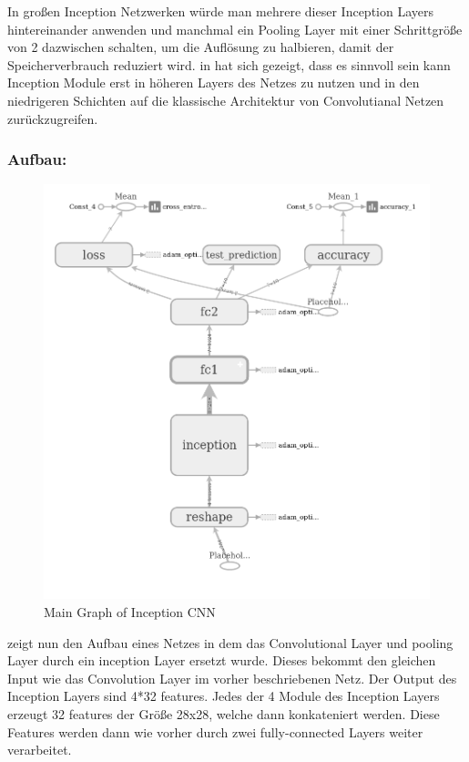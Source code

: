 \documentclass[runningheads,a4paper]{llncs}[2015/06/24]
\begin{document}
In großen Inception Netzwerken würde man mehrere dieser Inception Layers hintereinander anwenden und manchmal ein Pooling Layer mit einer Schrittgröße von 2 dazwischen schalten, um die Auflösung zu halbieren, damit der Speicherverbrauch reduziert wird. in \cite{inception_paper} hat sich gezeigt, dass es sinnvoll sein kann Inception Module erst in höheren Layers des Netzes zu nutzen und in den niedrigeren Schichten auf die klassische Architektur von Convolutianal Netzen zurückzugreifen.

\subsubsection*{Aufbau:}
\begin{figure}
	\includegraphics[width=\textwidth]{images/main_graph_inception.png}
	\caption{Main Graph of Inception CNN}
	\label{fig:main_graph_inception}
\end{figure}
 zeigt nun den Aufbau eines Netzes in dem das Convolutional Layer und pooling Layer durch ein inception Layer ersetzt wurde. Dieses bekommt den gleichen Input wie das Convolution Layer im vorher beschriebenen Netz. Der Output des Inception Layers sind 4*32 features. Jedes der 4 Module des Inception Layers erzeugt 32 features der Größe 28x28, welche dann konkateniert werden. Diese Features werden dann wie vorher durch zwei fully-connected Layers weiter verarbeitet.
\end{document}
